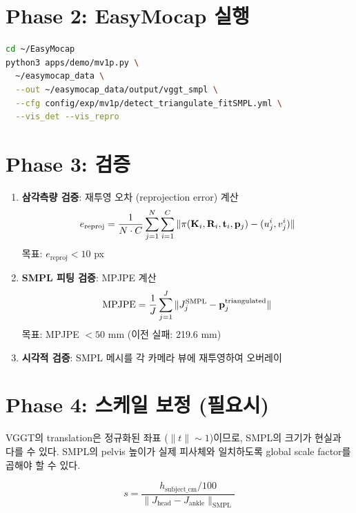 \documentclass[11pt, a4paper]{report}
\begin{document}
\section{Phase 2: EasyMocap 실행}

\begin{pipelinebox}[title={실행 명령}]
\begin{lstlisting}[language=bash]
cd ~/EasyMocap
python3 apps/demo/mv1p.py \
  ~/easymocap_data \
  --out ~/easymocap_data/output/vggt_smpl \
  --cfg config/exp/mv1p/detect_triangulate_fitSMPL.yml \
  --vis_det --vis_repro
\end{lstlisting}
\end{pipelinebox}


\section{Phase 3: 검증}

\begin{enumerate}[leftmargin=*]
  \item \textbf{삼각측량 검증}: 재투영 오차 (reprojection error) 계산
    \begin{equation}
    e_\text{reproj} = \frac{1}{N \cdot C} \sum_{j=1}^{N} \sum_{i=1}^{C} \| \pi(\mathbf{K}_i, \mathbf{R}_i, \mathbf{t}_i, \mathbf{p}_j) - (u_j^i, v_j^i) \|
    \end{equation}
    목표: $e_\text{reproj} < 10$ px

  \item \textbf{SMPL 피팅 검증}: MPJPE 계산
    \begin{equation}
    \text{MPJPE} = \frac{1}{J} \sum_{j=1}^{J} \| J_j^\text{SMPL} - \mathbf{p}_j^\text{triangulated} \|
    \end{equation}
    목표: MPJPE $< 50$ mm (이전 실패: 219.6 mm)

  \item \textbf{시각적 검증}: SMPL 메시를 각 카메라 뷰에 재투영하여 오버레이
\end{enumerate}


\section{Phase 4: 스케일 보정 (필요시)}

\begin{warningbox}
VGGT의 translation은 정규화된 좌표 ($\|t\| \sim 1$)이므로, SMPL의 크기가 현실과 다를 수 있다. SMPL의 pelvis 높이가 실제 피사체와 일치하도록 global scale factor를 곱해야 할 수 있다.

\begin{equation}
s = \frac{h_\text{subject\_cm} / 100}{\|J_\text{head} - J_\text{ankle}\|_\text{SMPL}}
\end{equation}
\end{warningbox}
\end{document}
